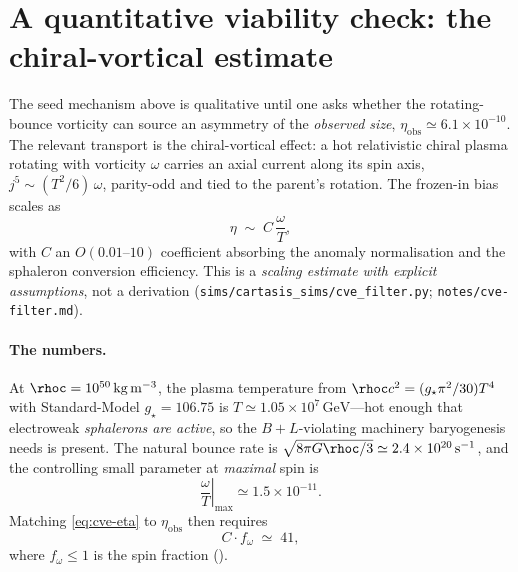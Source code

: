 \section{A quantitative viability check: the chiral-vortical estimate}
\label{sec:cve-estimate}

The seed mechanism above is qualitative until one asks whether the
rotating-bounce vorticity can source an asymmetry of the \emph{observed size},
$\eta_{\mathrm{obs}}\simeq6.1\times10^{-10}$. The relevant transport is the
chiral-vortical effect: a hot relativistic chiral plasma rotating with vorticity
$\omega$ carries an axial current along its spin axis, $j^5\sim(T^2/6)\,\omega$,
parity-odd and tied to the parent's rotation. The frozen-in bias scales as
\begin{equation}
  \eta \;\sim\; C\,\frac{\omega}{T},
  \label{eq:cve-eta}
\end{equation}
with $C$ an $O(0.01\text{--}10)$ coefficient absorbing the anomaly normalisation
and the sphaleron conversion efficiency. This is a \emph{scaling estimate with
explicit assumptions}, not a derivation
(\texttt{sims/cartasis\_sims/cve\_filter.py}; \texttt{notes/cve-filter.md}).

\paragraph{The numbers.} At $\rhoc=10^{50}\,\mathrm{kg\,m^{-3}}$, the plasma
temperature from $\rhoc c^2=(g_\star\pi^2/30)T^4$ with Standard-Model
$g_\star=106.75$ is $T\simeq1.05\times10^{7}\,\mathrm{GeV}$---hot enough that
electroweak \emph{sphalerons are active}, so the $B{+}L$-violating machinery
baryogenesis needs is present. The natural bounce rate is
$\sqrt{8\pi G\rhoc/3}\simeq2.4\times10^{20}\,\mathrm{s^{-1}}$, and the controlling
small parameter at \emph{maximal} spin is
\begin{equation}
  \left.\frac{\omega}{T}\right|_{\max} \simeq 1.5\times10^{-11}.
  \label{eq:cve-omegaT}
\end{equation}
Matching \eqref{eq:cve-eta} to $\eta_{\mathrm{obs}}$ then requires
\begin{equation}
  C\cdot f_\omega \;\simeq\; 41,
  \label{eq:cve-need}
\end{equation}
where $f_\omega\le1$ is the spin fraction ().

